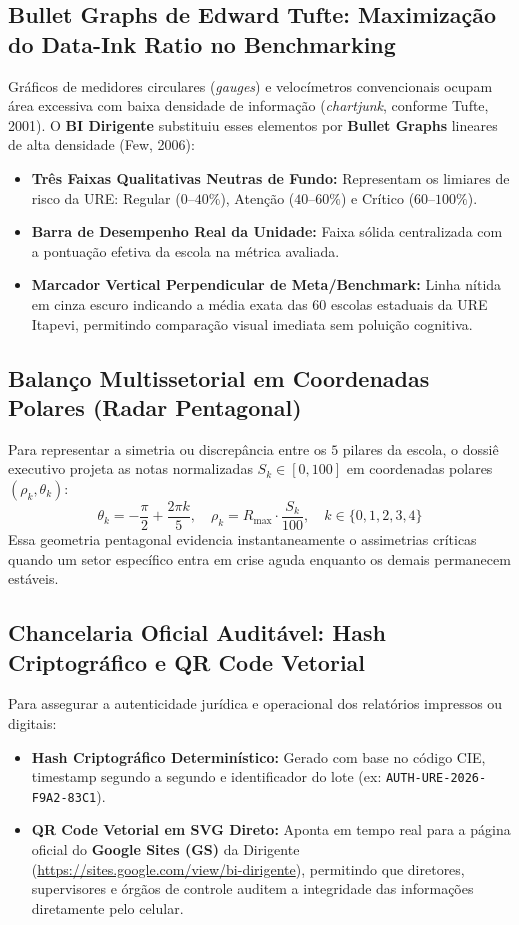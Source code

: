 \documentclass[9pt,a4paper]{extarticle}
\begin{document}
\subsection{Bullet Graphs de Edward Tufte: Maximização do Data-Ink Ratio no Benchmarking}
Gráficos de medidores circulares (\emph{gauges}) e velocímetros convencionais ocupam área excessiva com baixa densidade de informação (\emph{chartjunk}, conforme Tufte, 2001). O \textbf{BI Dirigente} substituiu esses elementos por \textbf{Bullet Graphs} lineares de alta densidade (Few, 2006):
\begin{itemize}[leftmargin=1.5em, itemsep=2pt]
    \item \textbf{Três Faixas Qualitativas Neutras de Fundo:} Representam os limiares de risco da URE: Regular ($0\text{--}40\%$), Atenção ($40\text{--}60\%$) e Crítico ($60\text{--}100\%$).
    \item \textbf{Barra de Desempenho Real da Unidade:} Faixa sólida centralizada com a pontuação efetiva da escola na métrica avaliada.
    \item \textbf{Marcador Vertical Perpendicular de Meta/Benchmark:} Linha nítida em cinza escuro indicando a média exata das $60$ escolas estaduais da URE Itapevi, permitindo comparação visual imediata sem poluição cognitiva.
\end{itemize}

\subsection{Balanço Multissetorial em Coordenadas Polares (Radar Pentagonal)}
Para representar a simetria ou discrepância entre os $5$ pilares da escola, o dossiê executivo projeta as notas normalizadas $S_k \in [0, 100]$ em coordenadas polares $(\rho_k, \theta_k)$:
\begin{equation}
\theta_k = -\frac{\pi}{2} + \frac{2\pi k}{5}, \quad \rho_k = R_{\max} \cdot \frac{S_k}{100}, \quad k \in \{0, 1, 2, 3, 4\}
\end{equation}
Essa geometria pentagonal evidencia instantaneamente o assimetrias críticas quando um setor específico entra em crise aguda enquanto os demais permanecem estáveis.

\subsection{Chancelaria Oficial Auditável: Hash Criptográfico e QR Code Vetorial}
Para assegurar a autenticidade jurídica e operacional dos relatórios impressos ou digitais:
\begin{itemize}[leftmargin=1.5em, itemsep=2pt]
    \item \textbf{Hash Criptográfico Determinístico:} Gerado com base no código CIE, timestamp segundo a segundo e identificador do lote (ex: \texttt{AUTH-URE-2026-F9A2-83C1}).
    \item \textbf{QR Code Vetorial em SVG Direto:} Aponta em tempo real para a página oficial do \textbf{Google Sites (GS)} da Dirigente (\url{https://sites.google.com/view/bi-dirigente}), permitindo que diretores, supervisores e órgãos de controle auditem a integridade das informações diretamente pelo celular.
\end{itemize}
\end{document}

